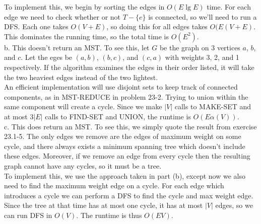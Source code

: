 \documentclass{article}
\begin{document}
\begin{enumerate}[a.]
To implement this, we begin by sorting the edges in $O(E\lg E)$ time.  For each edge we need to check whether or not $T-\{e\}$ is connected, so we'll need to run a DFS.  Each one takes $O(V+E)$, so doing this for all edges takes $O(E(V+E)$.  This dominates the running time, so the total time is $O(E^2)$.\\

b. This doesn't return an MST.  To see this, let $G$ be the graph on 3 vertices $a$, $b$, and $c$.  Let the eges be $(a,b)$, $(b,c)$, and $(c,a)$ with weights 3, 2, and 1 respectively.  If the algorithm examines the edges in their order listed, it will take the two heaviest edges instead of the two lightest. \\

An efficient implementation will use disjoint sets to keep track of connected components, as in MST-REDUCE in problem 23-2.  Trying to union within the same component will create a cycle.  Since we make $|V|$ calls to MAKE-SET and at most $3|E|$ calls to FIND-SET and UNION, the runtime is $O(E\alpha(V))$.\\

c. This does return an MST.  To see this, we simply quote the result from exercise 23.1-5.  The only edges we remove are the edges of maximum weight on some cycle, and there always exists a minimum spanning tree which doesn't include these edges.  Moreover, if we remove an edge from every cycle then the resulting graph cannot have any cycles, so it must be a tree.\\

To implement this, we use the approach taken in part (b), except now we also need to find the maximum weight edge on a cycle. For each edge which introduces a cycle we can perform a DFS to find the cycle and max weight edge.  Since the tree at that time has at most one cycle, it has at most $|V|$ edges, so we can run DFS in $O(V)$.  The runtime is thus $O(EV)$.\\

\end{enumerate}
\end{document}
